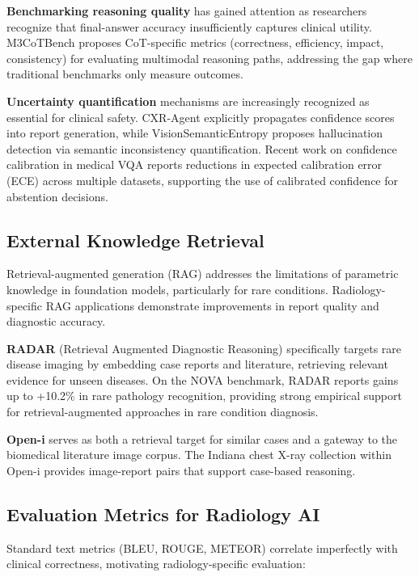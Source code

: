 \documentclass[11pt]{article}
\begin{document}
\textbf{Benchmarking reasoning quality} has gained attention as researchers recognize that final-answer accuracy insufficiently captures clinical utility. M3CoTBench \citep{jiang2026m3cotbench} proposes CoT-specific metrics (correctness, efficiency, impact, consistency) for evaluating multimodal reasoning paths, addressing the gap where traditional benchmarks only measure outcomes.

\textbf{Uncertainty quantification} mechanisms are increasingly recognized as essential for clinical safety. CXR-Agent \citep{sharma2024cxragent} explicitly propagates confidence scores into report generation, while VisionSemanticEntropy \citep{dse2024} proposes hallucination detection via semantic inconsistency quantification. Recent work on confidence calibration in medical VQA reports reductions in expected calibration error (ECE) across multiple datasets, supporting the use of calibrated confidence for abstention decisions.

\subsection{External Knowledge Retrieval}

Retrieval-augmented generation (RAG) addresses the limitations of parametric knowledge in foundation models, particularly for rare conditions. Radiology-specific RAG applications \citep{ragradiology2024} demonstrate improvements in report quality and diagnostic accuracy.

\textbf{RADAR} (Retrieval Augmented Diagnostic Reasoning) \citep{radar2024} specifically targets rare disease imaging by embedding case reports and literature, retrieving relevant evidence for unseen diseases. On the NOVA benchmark, RADAR reports gains up to +10.2\% in rare pathology recognition, providing strong empirical support for retrieval-augmented approaches in rare condition diagnosis.

\textbf{Open-i} \citep{demnerfushman2016} serves as both a retrieval target for similar cases and a gateway to the biomedical literature image corpus. The Indiana chest X-ray collection within Open-i provides image-report pairs that support case-based reasoning.

\subsection{Evaluation Metrics for Radiology AI}

Standard text metrics (BLEU, ROUGE, METEOR) correlate imperfectly with clinical correctness, motivating radiology-specific evaluation:
\end{document}
